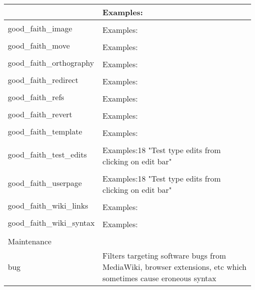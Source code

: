 \begin{longtable}{ | p{5cm} | p{9cm} | }
                                     & Examples:\\
    \hline
    \multirow{2}{*}{good\_faith\_image} & \\
                                     & Examples:\\
    \hline
    \multirow{2}{*}{good\_faith\_move} & \\
                                     & Examples:\\
    \hline
    \multirow{2}{*}{good\_faith\_orthography} & \\
                                     & Examples:\\
    \hline
    \multirow{2}{*}{good\_faith\_redirect} & \\
                                     & Examples:\\
    \hline
    \multirow{2}{*}{good\_faith\_refs} & \\
                                     & Examples:\\
    \hline
    \multirow{2}{*}{good\_faith\_revert} & \\
                                     & Examples:\\
    \hline
    \multirow{2}{*}{good\_faith\_template} & \\
                                     & Examples:\\
    \hline
    \multirow{2}{*}{good\_faith\_test\_edits} & \\
                                     & Examples:18 "Test type edits from clicking on edit bar"\\
    \hline
    \multirow{2}{*}{good\_faith\_userpage} & \\
                                     & Examples:18 "Test type edits from clicking on edit bar"\\
    \hline
    \multirow{2}{*}{good\_faith\_wiki\_links} & \\
                                     & Examples:\\
    \hline
    \multirow{2}{*}{good\_faith\_wiki\_syntax} & \\
                                     & Examples:\\
    \hline
        \multicolumn{2}{|l|}{} \\
    \hline
        \multicolumn{2}{|l|}{Maintenance} \\
    \hline
    \multirow{2}{*}{bug} & Filters targeting software bugs from MediaWiki, browser extensions, etc which sometimes cause eroneous syntax\\

\end{longtable}
